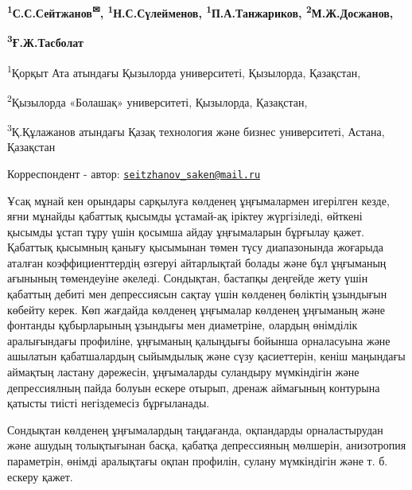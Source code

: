 
\begin{articleheader}


{\bfseries \textsuperscript{1}С.С.Сейтжанов\textsuperscript{✉},
\textsuperscript{1}Н.С.Сүлейменов, \textsuperscript{1}П.А.Танжариков,
\textsuperscript{2}М.Ж.Досжанов,}

{\bfseries \textsuperscript{3}Ғ.Ж.Тасболат}
\end{articleheader}
\begin{affiliation}
\textsuperscript{1}Қорқыт Ата атындағы Қызылорда университеті,
Қызылорда, Қазақстан,

\textsuperscript{2}Қызылорда «Болашақ» университеті, Қызылорда,
Қазақстан,

\textsuperscript{3}Қ.Құлажанов атындағы Қазақ технология және бизнес
университеті, Астана, Қазақстан

\raggedright {\bfseries \textsuperscript{\envelope }}Корреспондент - автор: \href{mailto:seitzhanov_saken@mail.ru}{\nolinkurl{seitzhanov\_saken@mail.ru}}
\end{affiliation}

Ұсақ мұнай кен орындары сарқылуға көлденең ұңғымалармен игерілген кезде,
яғни мұнайды қабаттық қысымды ұстамай-ақ іріктеу жүргізіледі, өйткені
қысымды ұстап тұру үшін қосымша айдау ұңғымаларын бұрғылау қажет.
Қабаттық қысымның қанығу қысымынан төмен түсу диапазонында жоғарыда
аталған коэффициенттердің өзгеруі айтарлықтай болады және бұл ұңғыманың
ағынының төмендеуіне әкеледі. Сондықтан, бастапқы деңгейде жету үшін
қабаттың дебиті мен депрессиясын сақтау үшін көлденең бөліктің ұзындығын
көбейту керек. Көп жағдайда көлденең ұңғымалар көлденең ұңғыманың және
фонтанды құбырларының ұзындығы мен диаметріне, олардың өнімділік
аралығындағы профиліне, ұңғыманың қалыңдығы бойынша орналасуына және
ашылатын қабатшалардың сыйымдылық және сүзу қасиеттерін, кеніш маңындағы
аймақтың ластану дәрежесін, ұңғымаларды суландыру мүмкіндігін және
депрессиялның пайда болуын ескере отырып, дренаж аймағының контурына
қатысты тиісті негіздемесіз бұрғыланады.

Сондықтан көлденең ұңғымалардың таңдағанда, оқпандарды орналастырудан
және ашудың толықтығынан басқа, қабатқа депрессияның мөлшерін,
анизотропия параметрін, өнімді аралықтағы оқпан профилін, сулану
мүмкіндігін және т. б. ескеру қажет.

